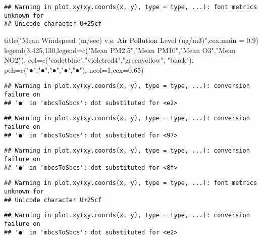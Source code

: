 \documentclass[
]{article}
\newenvironment{Shaded}{\begin{snugshade}}{\end{snugshade}}
\newcommand{\AttributeTok}[1]{\textcolor[rgb]{0.77,0.63,0.00}{#1}}
\newcommand{\DecValTok}[1]{\textcolor[rgb]{0.00,0.00,0.81}{#1}}
\newcommand{\FloatTok}[1]{\textcolor[rgb]{0.00,0.00,0.81}{#1}}
\newcommand{\FunctionTok}[1]{\textcolor[rgb]{0.00,0.00,0.00}{#1}}
\newcommand{\NormalTok}[1]{#1}
\newcommand{\StringTok}[1]{\textcolor[rgb]{0.31,0.60,0.02}{#1}}
\begin{document}
\begin{verbatim}
## Warning in plot.xy(xy.coords(x, y), type = type, ...): font metrics unknown for
## Unicode character U+25cf
\end{verbatim}

\begin{Shaded}
\begin{Highlighting}[]
\FunctionTok{title}\NormalTok{(}\StringTok{"Mean Windspeed (m/sec) v.s. Air Pollution Level (ug/m3)"}\NormalTok{,}\AttributeTok{cex.main =} \FloatTok{0.9}\NormalTok{)}
\FunctionTok{legend}\NormalTok{(}\FloatTok{3.425}\NormalTok{,}\DecValTok{130}\NormalTok{,}\AttributeTok{legend=}\FunctionTok{c}\NormalTok{(}\StringTok{"Mean PM2.5"}\NormalTok{,}\StringTok{"Mean PM10"}\NormalTok{,}\StringTok{"Mean O3"}\NormalTok{,}\StringTok{"Mean NO2"}\NormalTok{), }\AttributeTok{col=}\FunctionTok{c}\NormalTok{(}\StringTok{"cadetblue"}\NormalTok{,}\StringTok{"violetred4"}\NormalTok{,}\StringTok{"greenyellow"}\NormalTok{, }\StringTok{"black"}\NormalTok{), }\AttributeTok{pch=}\FunctionTok{c}\NormalTok{(}\StringTok{"●"}\NormalTok{,}\StringTok{"●"}\NormalTok{,}\StringTok{"●"}\NormalTok{,}\StringTok{"●"}\NormalTok{,}\StringTok{"●"}\NormalTok{), }\AttributeTok{ncol=}\DecValTok{1}\NormalTok{,}\AttributeTok{cex=}\FloatTok{0.65}\NormalTok{)}
\end{Highlighting}
\end{Shaded}

\begin{verbatim}
## Warning in plot.xy(xy.coords(x, y), type = type, ...): conversion failure on
## '●' in 'mbcsToSbcs': dot substituted for <e2>
\end{verbatim}

\begin{verbatim}
## Warning in plot.xy(xy.coords(x, y), type = type, ...): conversion failure on
## '●' in 'mbcsToSbcs': dot substituted for <97>
\end{verbatim}

\begin{verbatim}
## Warning in plot.xy(xy.coords(x, y), type = type, ...): conversion failure on
## '●' in 'mbcsToSbcs': dot substituted for <8f>
\end{verbatim}

\begin{verbatim}
## Warning in plot.xy(xy.coords(x, y), type = type, ...): font metrics unknown for
## Unicode character U+25cf
\end{verbatim}

\begin{verbatim}
## Warning in plot.xy(xy.coords(x, y), type = type, ...): conversion failure on
## '●' in 'mbcsToSbcs': dot substituted for <e2>
\end{verbatim}
\end{document}
